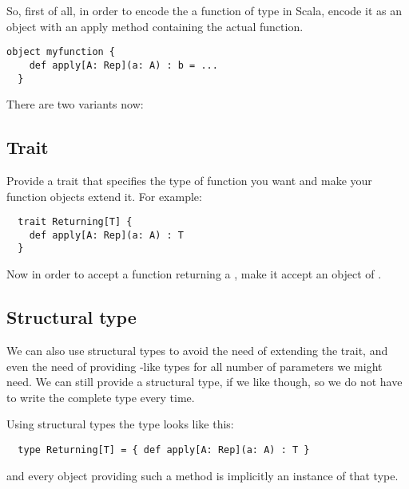 So, first of all, in order to encode the a function of type 
in Scala, encode it as an object with an apply method containing the actual
function.
\begin{lstlisting}[float=ht,caption=Encoding an existential function]
  object myfunction {
    def apply[A: Rep](a: A) : b = ...
  }
\end{lstlisting}
There are two variants now:

\subsection{Trait}
Provide a trait that specifies the type of function you want and make your
function objects extend it. For example:
\begin{lstlisting}
  trait Returning[T] {
    def apply[A: Rep](a: A) : T
  }
\end{lstlisting}

Now in order to accept a function returning a , make it accept an object
of .

\subsection{Structural type}
We can also use structural types to avoid the need of extending the trait, and
even the need of providing -like types for all number of parameters
we might need. We can still provide a  structural type, if we like
though, so we do not have to write the complete type every time.

Using structural types the  type looks like this:
\begin{lstlisting}
  type Returning[T] = { def apply[A: Rep](a: A) : T }
\end{lstlisting}
and every object providing such a method is implicitly an instance of that type.
